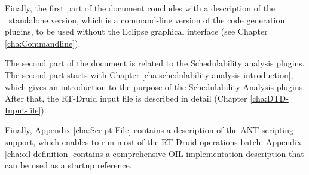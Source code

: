 Finally, the first part of the document concludes with a description
of the \rtd\ standalone version, which is a command-line version of
the code generation plugins, to be used without the Eclipse graphical
interface (see Chapter \ref{cha:Commandline}).

The second part of the document is related to the Schedulability
analysis plugins. The second part starts with Chapter
\ref{cha:schedulability-analysis-introduction}, which gives an
introduction to the purpose of the Schedulability Analysis
plugins. After that, the RT-Druid input file is described in detail
(Chapter \ref{cha:DTD-Input-file}).

Finally, Appendix \ref{cha:Script-File} contains a description of the
ANT scripting support, which enables to run most of the RT-Druid
operations batch. Appendix \ref{cha:oil-definition} contains a
comprehensive OIL implementation description that can be used as a
startup reference.

